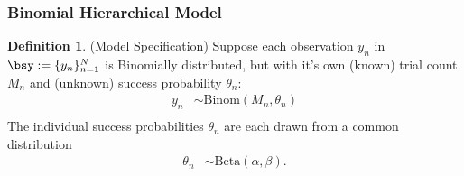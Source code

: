 \documentclass[12pt]{article}
\theoremstyle{plain}
\theoremstyle{definition}
\newtheorem{defn}[thm]{Definition}
\theoremstyle{remark}
\newcommand{\bsmu}{\boldsymbol{\mu}}
\newcommand{\nN}{_{n=1}^N}
\begin{document}


\clearpage
\subsubsection{Binomial Hierarchical Model}

\begin{defn}(Model Specification)
Suppose each observation $y_n$ in $\bsy:=\{y_n\}\nN$ is Binomially
distributed, but with it's own (known) trial count $M_n$ and (unknown)
success probability $\theta_n$:
\begin{align*}
  y_n &\sim \text{Binom}(M_n, \theta_n)\\
\end{align*}
The individual success probabilities $\theta_n$ are each drawn from a
common distribution
\begin{align*}
   \theta_n &\sim \text{Beta}(\alpha, \beta).
\end{align*}
\end{defn}
\end{document}
